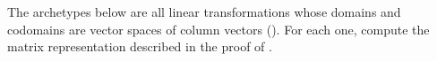 The archetypes below are all linear transformations whose domains and codomains are vector spaces of column vectors ().  For each one, compute the matrix representation described in the proof of .\\
\\
\\
\\
\\
\\
